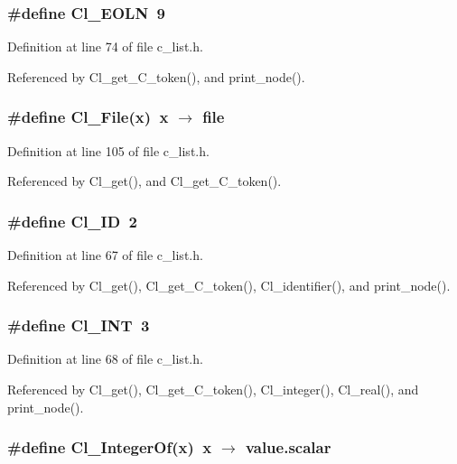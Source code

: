 \subsubsection{\setlength{\rightskip}{0pt plus 5cm}\#define Cl\_\-EOLN~9}\label{c__list_8h_1a5cbafc3c6497535ff495ce10bd8ac0}




Definition at line 74 of file c\_\-list.h.

Referenced by Cl\_\-get\_\-C\_\-token(), and print\_\-node().
\subsubsection{\setlength{\rightskip}{0pt plus 5cm}\#define Cl\_\-File(x)~x $\rightarrow$ \bf{file}}\label{c__list_8h_cf4ddb1636dd39c2015842f7615271da}




Definition at line 105 of file c\_\-list.h.

Referenced by Cl\_\-get(), and Cl\_\-get\_\-C\_\-token().
\subsubsection{\setlength{\rightskip}{0pt plus 5cm}\#define Cl\_\-ID~2}\label{c__list_8h_52dfef71d96ab9bf9808da607e59c4f1}




Definition at line 67 of file c\_\-list.h.

Referenced by Cl\_\-get(), Cl\_\-get\_\-C\_\-token(), Cl\_\-identifier(), and print\_\-node().
\subsubsection{\setlength{\rightskip}{0pt plus 5cm}\#define Cl\_\-INT~3}\label{c__list_8h_83d686280e20238e078e5bdfd9e8cb9b}




Definition at line 68 of file c\_\-list.h.

Referenced by Cl\_\-get(), Cl\_\-get\_\-C\_\-token(), Cl\_\-integer(), Cl\_\-real(), and print\_\-node().
\subsubsection{\setlength{\rightskip}{0pt plus 5cm}\#define Cl\_\-Integer\-Of(x)~x $\rightarrow$ value.scalar}\label{c__list_8h_b0f0ca2ac875712c13f05ba4de27a3fc}





